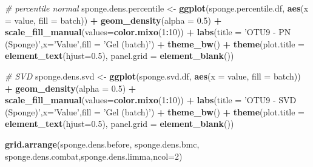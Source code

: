 \documentclass[]{book}
\newenvironment{Shaded}{\begin{snugshade}}{\end{snugshade}}
\newcommand{\KeywordTok}[1]{\textcolor[rgb]{0.13,0.29,0.53}{\textbf{#1}}}
\newcommand{\DataTypeTok}[1]{\textcolor[rgb]{0.13,0.29,0.53}{#1}}
\newcommand{\DecValTok}[1]{\textcolor[rgb]{0.00,0.00,0.81}{#1}}
\newcommand{\FloatTok}[1]{\textcolor[rgb]{0.00,0.00,0.81}{#1}}
\newcommand{\StringTok}[1]{\textcolor[rgb]{0.31,0.60,0.02}{#1}}
\newcommand{\CommentTok}[1]{\textcolor[rgb]{0.56,0.35,0.01}{\textit{#1}}}
\newcommand{\OperatorTok}[1]{\textcolor[rgb]{0.81,0.36,0.00}{\textbf{#1}}}
\newcommand{\NormalTok}[1]{#1}
\begin{document}
\begin{Shaded}
\begin{Highlighting}[]
\CommentTok{# percentile normal}
\NormalTok{sponge.dens.percentile <-}\StringTok{ }\KeywordTok{ggplot}\NormalTok{(sponge.percentile.df, }\KeywordTok{aes}\NormalTok{(}\DataTypeTok{x =}\NormalTok{ value, }\DataTypeTok{fill =}\NormalTok{ batch)) }\OperatorTok{+}\StringTok{ }\KeywordTok{geom_density}\NormalTok{(}\DataTypeTok{alpha =} \FloatTok{0.5}\NormalTok{) }\OperatorTok{+}\StringTok{ }\KeywordTok{scale_fill_manual}\NormalTok{(}\DataTypeTok{values=}\KeywordTok{color.mixo}\NormalTok{(}\DecValTok{1}\OperatorTok{:}\DecValTok{10}\NormalTok{)) }\OperatorTok{+}\StringTok{ }\KeywordTok{labs}\NormalTok{(}\DataTypeTok{title =} \StringTok{'OTU9 - PN (Sponge)'}\NormalTok{,}\DataTypeTok{x=}\StringTok{'Value'}\NormalTok{,}\DataTypeTok{fill =} \StringTok{'Gel (batch)'}\NormalTok{) }\OperatorTok{+}\StringTok{ }\KeywordTok{theme_bw}\NormalTok{() }\OperatorTok{+}\StringTok{ }\KeywordTok{theme}\NormalTok{(}\DataTypeTok{plot.title =} \KeywordTok{element_text}\NormalTok{(}\DataTypeTok{hjust=}\FloatTok{0.5}\NormalTok{), }\DataTypeTok{panel.grid =} \KeywordTok{element_blank}\NormalTok{())}


\CommentTok{# SVD}
\NormalTok{sponge.dens.svd <-}\StringTok{ }\KeywordTok{ggplot}\NormalTok{(sponge.svd.df, }\KeywordTok{aes}\NormalTok{(}\DataTypeTok{x =}\NormalTok{ value, }\DataTypeTok{fill =}\NormalTok{ batch)) }\OperatorTok{+}\StringTok{ }\KeywordTok{geom_density}\NormalTok{(}\DataTypeTok{alpha =} \FloatTok{0.5}\NormalTok{) }\OperatorTok{+}\StringTok{ }\KeywordTok{scale_fill_manual}\NormalTok{(}\DataTypeTok{values=}\KeywordTok{color.mixo}\NormalTok{(}\DecValTok{1}\OperatorTok{:}\DecValTok{10}\NormalTok{)) }\OperatorTok{+}\StringTok{ }\KeywordTok{labs}\NormalTok{(}\DataTypeTok{title =} \StringTok{'OTU9 - SVD (Sponge)'}\NormalTok{,}\DataTypeTok{x=}\StringTok{'Value'}\NormalTok{,}\DataTypeTok{fill =} \StringTok{'Gel (batch)'}\NormalTok{) }\OperatorTok{+}\StringTok{ }\KeywordTok{theme_bw}\NormalTok{() }\OperatorTok{+}\StringTok{ }\KeywordTok{theme}\NormalTok{(}\DataTypeTok{plot.title =} \KeywordTok{element_text}\NormalTok{(}\DataTypeTok{hjust=}\FloatTok{0.5}\NormalTok{), }\DataTypeTok{panel.grid =} \KeywordTok{element_blank}\NormalTok{())}
\end{Highlighting}
\end{Shaded}

\begin{Shaded}
\begin{Highlighting}[]
\KeywordTok{grid.arrange}\NormalTok{(sponge.dens.before, sponge.dens.bmc, sponge.dens.combat,sponge.dens.limma,}\DataTypeTok{ncol=}\DecValTok{2}\NormalTok{)}
\end{Highlighting}
\end{Shaded}
\end{document}
